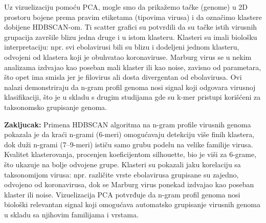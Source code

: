 \documentclass[a4paper,12pt]{article}
\begin{document}
Uz vizuelizaciju pomoću PCA, mogle smo da prikažemo tačke (genome) u 2D prostoru bojene prema pravim etiketama (tipovima virusa) i da označimo klastere dobijene HDBSCAN-om. Ti scatter grafici su potvrdili da
su tačke istih virusnih grupacija završile blizu jedna druge i u istom klasteru. Klasteri su imali biološku
interpretaciju: npr. svi ebolavirusi bili su blizu i dodeljeni jednom klasteru, odvojeni od klastera koji je obuhvatao koronaviruse. Marburg virus se u nekim analizama izdvajao kao poseban mali klaster ili kao noise, zavisno
od parametara, što opet ima smisla jer je filovirus ali dosta divergentan od ebolavirusa. Ovi nalazi
demonstriraju da n-gram profil genoma nosi signal koji odgovara virusnoj klasifikaciji, što je u skladu s
drugim studijama gde su k-mer pristupi korišćeni za taksonomsko grupisanje genoma.
\vspace{1cm}

\noindent
\begin{minipage}{\textwidth}
\textbf{Zakljucak:} Primena HDBSCAN algoritma na n-gram profile virusnih genoma pokazala je da kraći n-grami (6-meri) omogućavaju detekciju više finih klastera, dok duži n-grami (7–9-meri) ističu samo grubu podelu na velike familije virusa. Kvalitet klasterovanja, procenjen koeficijentom silhouette, bio je viši za 6-grame, što ukazuje na bolje odvojene grupe. Klasteri su pokazali jaku korelaciju sa taksonomijom virusa: npr. različite vrste ebolavirusa grupisane su zajedno, odvojeno od koronavirusa, dok se Marburg virus ponekad izdvajao kao poseban klaster ili noise. Vizuelizacija PCA potvrđuje da n-gram profil genoma nosi biološki relevantan signal koji omogućava automatsko grupisanje virusnih genoma u skladu sa njihovim familijama i vrstama.
\end{minipage}
\end{document}
